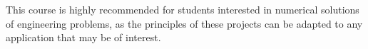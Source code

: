 \documentclass[twocolumn,10pt]{asme2ej}
\begin{document}
This course is highly recommended for students interested in numerical solutions of engineering problems, as the principles of these projects can be adapted to any application that may be of interest.










% 
% 


% 
% 


% 

% 
\end{document}
